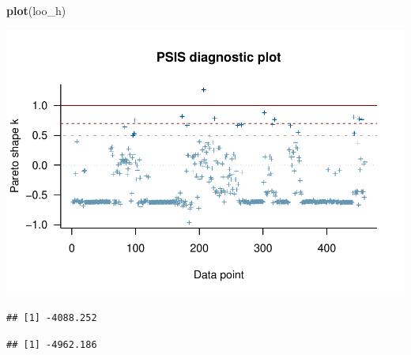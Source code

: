 \documentclass[]{article}
\newenvironment{Shaded}{\begin{snugshade}}{\end{snugshade}}
\newcommand{\KeywordTok}[1]{\textcolor[rgb]{0.13,0.29,0.53}{\textbf{#1}}}
\newcommand{\DecValTok}[1]{\textcolor[rgb]{0.00,0.00,0.81}{#1}}
\newcommand{\CommentTok}[1]{\textcolor[rgb]{0.56,0.35,0.01}{\textit{#1}}}
\newcommand{\OperatorTok}[1]{\textcolor[rgb]{0.81,0.36,0.00}{\textbf{#1}}}
\newcommand{\NormalTok}[1]{#1}
\begin{document}
\begin{Shaded}
\begin{Highlighting}[]
\KeywordTok{plot}\NormalTok{(loo_h)}
\end{Highlighting}
\end{Shaded}

\includegraphics{Data_science_project_files/figure-latex/unnamed-chunk-14-3.pdf}

\begin{Shaded}
\end{Shaded}

\begin{verbatim}
## [1] -4088.252
\end{verbatim}

\begin{Shaded}
\end{Shaded}

\begin{verbatim}
## [1] -4962.186
\end{verbatim}

\begin{Shaded}
\end{Shaded}
\end{document}
